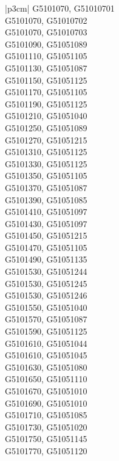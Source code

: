 \begin{customLongTable}{ |p{3cm}| }
G5101070, G51010701 \\ \hline
G5101070, G51010702 \\ \hline
G5101070, G51010703 \\ \hline
G5101090, G51051089 \\ \hline
G5101110, G51051105 \\ \hline
G5101130, G51051087 \\ \hline
G5101150, G51051125 \\ \hline
G5101170, G51051105 \\ \hline
G5101190, G51051125 \\ \hline
G5101210, G51051040 \\ \hline
G5101250, G51051089 \\ \hline
G5101270, G51051215 \\ \hline
G5101310, G51051125 \\ \hline
G5101330, G51051125 \\ \hline
G5101350, G51051105 \\ \hline
G5101370, G51051087 \\ \hline
G5101390, G51051085 \\ \hline
G5101410, G51051097 \\ \hline
G5101430, G51051097 \\ \hline
G5101450, G51051215 \\ \hline
G5101470, G51051105 \\ \hline
G5101490, G51051135 \\ \hline
G5101530, G51051244 \\ \hline
G5101530, G51051245 \\ \hline
G5101530, G51051246 \\ \hline
G5101550, G51051040 \\ \hline
G5101570, G51051087 \\ \hline
G5101590, G51051125 \\ \hline
G5101610, G51051044 \\ \hline
G5101610, G51051045 \\ \hline
G5101630, G51051080 \\ \hline
G5101650, G51051110 \\ \hline
G5101670, G51051010 \\ \hline
G5101690, G51051010 \\ \hline
G5101710, G51051085 \\ \hline
G5101730, G51051020 \\ \hline
G5101750, G51051145 \\ \hline
G5101770, G51051120 \\ \hline

\end{customLongTable}
